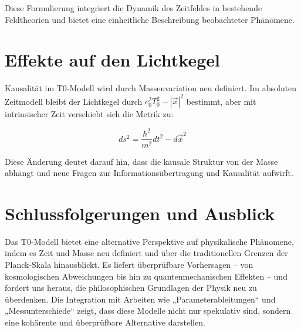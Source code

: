 \documentclass[a4paper,12pt]{article}
\begin{document}
	Diese Formulierung integriert die Dynamik des Zeitfeldes in bestehende Feldtheorien und bietet eine einheitliche Beschreibung beobachteter Phänomene.
	
	\section{Effekte auf den Lichtkegel}
	
	Kausalität im T0-Modell wird durch Massenvariation neu definiert. Im absoluten Zeitmodell bleibt der Lichtkegel durch \(c_0^2 T_0^2 - |\vec{x}|^2\) bestimmt, aber mit intrinsischer Zeit verschiebt sich die Metrik zu:
	
	\begin{equation}
		ds^2 = \frac{\hbar^2}{m^2} dt^2 - d\vec{x}^2
	\end{equation}
	
	Diese Änderung deutet darauf hin, dass die kausale Struktur von der Masse abhängt und neue Fragen zur Informationsübertragung und Kausalität aufwirft.
	
	\section{Schlussfolgerungen und Ausblick}
	
	Das T0-Modell bietet eine alternative Perspektive auf physikalische Phänomene, indem es Zeit und Masse neu definiert und über die traditionellen Grenzen der Planck-Skala hinausblickt. Es liefert überprüfbare Vorhersagen – von kosmologischen Abweichungen bis hin zu quantenmechanischen Effekten – und fordert uns heraus, die philosophischen Grundlagen der Physik neu zu überdenken. Die Integration mit Arbeiten wie „Parameterableitungen“ \cite{pascher_params_2025} und „Messunterschiede“ \cite{pascher_messdifferenzen_2025} zeigt, dass diese Modelle nicht nur spekulativ sind, sondern eine kohärente und überprüfbare Alternative darstellen.
	
\end{document}
